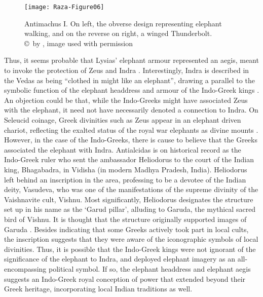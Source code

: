 \documentclass{ijsra}
\begin{document}
\begin{figure}[!htb] %
	\centering
	\texttt{[image: Raza-Figure06]}
	\caption{Antimachus I. On left, the obverse design representing elephant walking, and on the reverse on right, a winged Thunderbolt.
		{\normalfont\scriptsize \\ \copyright\ by \citeauthor{Coin}, image used with permission}}
	\label{fig:Raza-Figure06}
\end{figure}

Thus, it seems probable that Lysias’ elephant armour represented an aegis, meant to invoke the protection of Zeus and Indra \parencite[71]{Whitehead1970}.
Interestingly, Indra is described in the Vedas as being “clothed in might like an elephant”, drawing a parallel to
the symbolic function of the elephant headdress and armour of the Indo-Greek kings \parencite[22]{Gupta1983}. 
An objection could be that, while the Indo-Greeks might have associated Zeus with the elephant,
it need not have necessarily denoted a connection to Indra. 
On Seleucid coinage, Greek divinities such as Zeus appear in an elephant driven chariot,
reflecting the exalted status of the royal war elephants as divine mounts \parencite[254--270]{Alonso2013}. 
However, in the case of the Indo-Greeks, there is cause to believe that the Greeks associated the elephant with Indra. 
Antialcidas is on historical record as the Indo-Greek ruler who sent the ambassador Heliodorus to the court of the Indian king,
Bhagabadra, in Vidisha (in modern Madhya Pradesh, India). 
Heliodorus left behind an inscription in the area, professing to be a devotee of the Indian deity, Vasudeva,
who was one of the manifestations of the supreme divinity of the Vaishnavite cult, Vishnu.
Most significantly, Heliodorus designates the structure set up in his name as the ‘Garud pillar’,
alluding to Garuda, the mythical sacred bird of Vishnu. 
It is thought that the structure originally supported images of Garuda \parencite[126--127]{Mairs2014}. 
Besides indicating that some Greeks actively took part in local cults, the inscription suggests that they were aware of
the iconographic symbols of local divinities. 
Thus, it is possible that the Indo-Greek kings were not ignorant of the significance of the elephant to Indra,
and deployed elephant imagery as an all-encompassing political symbol. 
If so, the elephant headdress and elephant aegis suggests an Indo-Greek royal conception of power that extended beyond
their Greek heritage, incorporating local Indian traditions as well.
\end{document}
